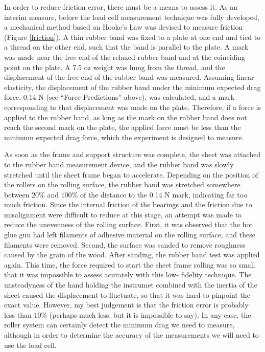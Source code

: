 \documentclass[12pt]{report} %
\begin{document}
In order to reduce friction error, there must be a means to assess it. As an interim measure, before the load cell measurement
technique was fully developed, a mechanical method based on Hooke's Law was devised to measure friction (Figure \ref{friction}).
A thin rubber band was fixed to a plate at one end and tied to a thread on the other end, such that the band is parallel to the
plate. A mark was made near the free
end of the relaxed rubber band and at the coinciding point on the plate. A 7.5 oz weight was hung from
the thread, and the displacement of the free end of the rubber band was measured. Assuming linear elasticity, the displacement
of the rubber band under the minimum expected drag force, 0.14 N (see ``Force Predictions'' above), was calculated, and a mark
corresponding to that displacement was made on the plate. Therefore, if a force is applied to the rubber band, as long as the
mark on the rubber band does not reach the second mark on the plate, the applied force must be less than the minimum expected
drag force, which the experiment is designed to measure.

As soon as the frame and support structure was complete, the sheet was attached to the rubber band measurement device, and the
rubber band was slowly stretched until the sheet frame began to accelerate. Depending on the position of the rollers
on the rolling surface, the rubber band was stretched somewhere between $20\%$ and $100\%$ of the distance to the 0.14 N mark,
indicating far too much friction. Since the internal friction of the bearings and the friction due to misalignment were difficult
to reduce at this stage, an attempt was made to reduce the unevenness of the rolling surface. First, it was observed that the
hot glue gun had left filaments of adhesive material on the rolling surface, and these filaments were removed. Second, the surface
was sanded to remove roughness caused by the grain of the wood. After sanding, the rubber band test was applied again. This time,
the force required to start the sheet frame rolling was so small that it was impossible to assess acurately with this low-
fidelity technique. The unsteadyness of the hand holding the instrumet combined with the inertia of the sheet caused the
displacement to fluctuate, so
that it was hard to pinpoint the exact value. However, my best judgement is that the friction error is probably less than $10\%$
(perhaps much less, but it is impossible to say). In any case, the roller system can certainly detect the minimum drag we
need to measure, although in order to determine the accuracy of the measurements we will need to use the load cell.
\end{document}
